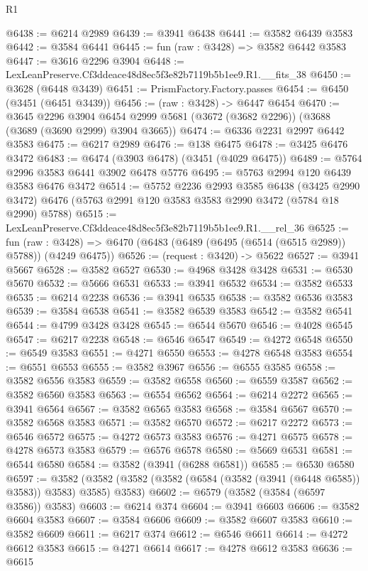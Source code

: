 \begin{lexlean}{R1}
\begin{coremodule}
@6438 := @6214 @2989
@6439 := @3941 @6438
@6441 := @3582 @6439 @3583
@6442 := @3584 @6441
@6445 := fun (raw : @3428) => @3582 @6442 @3583
@6447 := @3616 @2296 @3904
@6448 := LexLeanPreserve.Cf3ddeace48d8ec5f3e82b7119b5b1ee9.R1.__fits_38
@6450 := @3628 (@6448 @3439)
@6451 := PrismFactory.Factory.passes
@6454 := @6450 (@3451 (@6451 @3439))
@6456 := (raw : @3428) -> @6447 @6454
@6470 := @3645
    @2296
    @3904
    @6454
    @2999
    @5681
    (@3672 (@3682 @2296))
    (@3688 (@3689 (@3690 @2999) @3904 @3665))
@6474 := @6336 @2231 @2997 @6442 @3583
@6475 := @6217 @2989
@6476 := @138 @6475
@6478 := @3425 @6476 @3472
@6483 := @6474 (@3903 @6478) (@3451 (@4029 @6475))
@6489 := @5764 @2996 @3583 @6441 @3902 @6478 @5776
@6495 := @5763 @2994 @120 @6439 @3583 @6476 @3472
@6514 := @5752
    @2236
    @2993
    @3585
    @6438
    (@3425 @2990 @3472)
    @6476
    (@5763 @2991 @120 @3583 @3583 @2990 @3472 (@5784 @18 @2990) @5788)
@6515 := LexLeanPreserve.Cf3ddeace48d8ec5f3e82b7119b5b1ee9.R1.__rel_36
@6525 := fun (raw : @3428) =>
  @6470 (@6483 (@6489 (@6495 (@6514 (@6515 @2989)) @5788)) (@4249 @6475))
@6526 := (request : @3420) -> @5622
@6527 := @3941 @5667
@6528 := @3582 @6527
@6530 := @4968 @3428 @3428
@6531 := @6530 @5670
@6532 := @5666 @6531
@6533 := @3941 @6532
@6534 := @3582 @6533
@6535 := @6214 @2238
@6536 := @3941 @6535
@6538 := @3582 @6536 @3583
@6539 := @3584 @6538
@6541 := @3582 @6539 @3583
@6542 := @3582 @6541
@6544 := @4799 @3428 @3428
@6545 := @6544 @5670
@6546 := @4028 @6545
@6547 := @6217 @2238
@6548 := @6546 @6547
@6549 := @4272 @6548
@6550 := @6549 @3583
@6551 := @4271 @6550
@6553 := @4278 @6548 @3583
@6554 := @6551 @6553
@6555 := @3582 @3967
@6556 := @6555 @3585
@6558 := @3582 @6556 @3583
@6559 := @3582 @6558
@6560 := @6559 @3587
@6562 := @3582 @6560 @3583
@6563 := @6554 @6562
@6564 := @6214 @2272
@6565 := @3941 @6564
@6567 := @3582 @6565 @3583
@6568 := @3584 @6567
@6570 := @3582 @6568 @3583
@6571 := @3582 @6570
@6572 := @6217 @2272
@6573 := @6546 @6572
@6575 := @4272 @6573 @3583
@6576 := @4271 @6575
@6578 := @4278 @6573 @3583
@6579 := @6576 @6578
@6580 := @5669 @6531
@6581 := @6544 @6580
@6584 := @3582 (@3941 (@6288 @6581))
@6585 := @6530 @6580
@6597 := @3582 (@3582 (@3582 (@3582 (@6584 (@3582 (@3941 (@6448 @6585)) @3583)) @3583) @3585) @3583)
@6602 := @6579 (@3582 (@3584 (@6597 @3586)) @3583)
@6603 := @6214 @374
@6604 := @3941 @6603
@6606 := @3582 @6604 @3583
@6607 := @3584 @6606
@6609 := @3582 @6607 @3583
@6610 := @3582 @6609
@6611 := @6217 @374
@6612 := @6546 @6611
@6614 := @4272 @6612 @3583
@6615 := @4271 @6614
@6617 := @4278 @6612 @3583
@6636 := @6615

\end{coremodule}
\end{lexlean}
